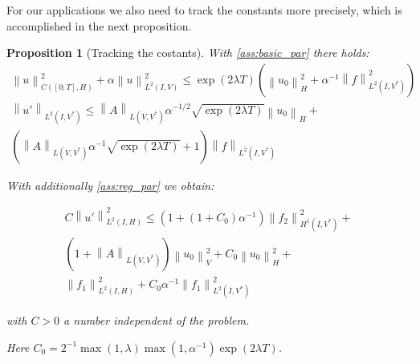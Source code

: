 \documentclass[english,a4paper,12pt,oneside]{scrbook}
\theoremstyle{break}
\newtheorem{prop}[equation]{Proposition}
\theoremstyle{remark}
\newcommand{\ds}{\displaystyle}
\newcommand{\norm}[1]{\left\lVert#1\right\rVert}
\newcommand{\HN}[1]{\norm{#1}_{H}}
\newcommand{\VN}[1]{\norm{#1}_{V}}
\begin{document}
For our applications we also need to track the constants more precisely, which is accomplished in the next proposition.

\begin{prop}[Tracking the costants]
\label{thm:const_track}
With \cref{ass:basic_par} there holds:
\begin{align}
\norm{u}^2_{C([0;T],H)}+\alpha\norm{u}_{L^2(I,V)}^2\leq \exp(2\lambda T)(\HN{u_0}^2+\alpha^{-1}\norm{f}^2_{L^2(I,V^*)})\\
\norm{u'}_{L^2(I,V^*)}\leq \norm{A}_{L(V,V^*)}\alpha^{-1/2}\sqrt{\exp(2\lambda T)}\HN{u_0} +\\\left (\norm{A}_{L(V,V^*)}\alpha^{-1}\sqrt{\exp(2\lambda T)}+1\right ) \norm{f}_{L^2(I,V^*)}
\end{align}

With additionally \cref{ass:reg_par} we obtain:

\begin{align}
C\norm{u'}^2_{L^2(I,H)}\leq 
(1+(1+C_0)\alpha^{-1})\norm{f_2}_{H^1(I,V^*)}^2+\\
(1+\norm{A}_{L(V,V^*)})\VN{u_{0}}^2+C_0\HN{u_0}^2+\\
\norm{f_1}_{L^2(I,H)}^2+C_0\alpha^{-1}\norm{f_1}^2_{L^2(I,V^*)}
\end{align}

with $C>0$ a number independent of the problem.

Here $C_0 = \ds 2^{-1}\max(1,\lambda)\max(1,\alpha^{-1})\exp(2\lambda T)$.

\end{prop}
\end{document}

